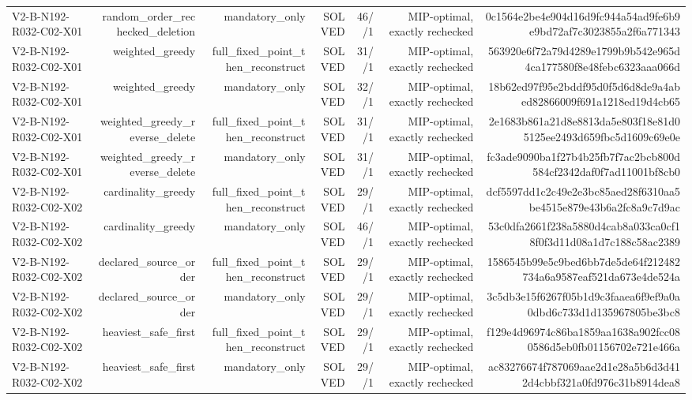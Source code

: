 {\begin{longtable}{lrrrrrr}
V2-B-N192-R032-C02-X01 & random\_order\_rechecked\_deletion & mandatory\_only & SOLVED & 46//1 & MIP-optimal, exactly rechecked & 0c1564e2be4e904d16d9fc944a54ad9fe6b9e9bd72af7c3023855a2f6a771343 \\
V2-B-N192-R032-C02-X01 & weighted\_greedy & full\_fixed\_point\_then\_reconstruct & SOLVED & 31//1 & MIP-optimal, exactly rechecked & 563920e6f72a79d4289e1799b9b542e965d4ca177580f8e48febc6323aaa066d \\
V2-B-N192-R032-C02-X01 & weighted\_greedy & mandatory\_only & SOLVED & 32//1 & MIP-optimal, exactly rechecked & 18b62ed97f95e2bddf95d0f5d6d8de9a4abed82866009f691a1218ed19d4cb65 \\
V2-B-N192-R032-C02-X01 & weighted\_greedy\_reverse\_delete & full\_fixed\_point\_then\_reconstruct & SOLVED & 31//1 & MIP-optimal, exactly rechecked & 2e1683b861a21d8e8813da5e803f18e81d05125ee2493d659fbc5d1609c69e0e \\
V2-B-N192-R032-C02-X01 & weighted\_greedy\_reverse\_delete & mandatory\_only & SOLVED & 31//1 & MIP-optimal, exactly rechecked & fc3ade9090ba1f27b4b25fb7f7ac2bcb800d584cf2342daf0f7ad11001bf8cb0 \\
V2-B-N192-R032-C02-X02 & cardinality\_greedy & full\_fixed\_point\_then\_reconstruct & SOLVED & 29//1 & MIP-optimal, exactly rechecked & dcf5597dd1c2c49e2e3bc85aed28f6310aa5be4515e879e43b6a2fc8a9c7d9ac \\
V2-B-N192-R032-C02-X02 & cardinality\_greedy & mandatory\_only & SOLVED & 46//1 & MIP-optimal, exactly rechecked & 53c0dfa2661f238a5880d4cab8a033ca0cf18f0f3d11d08a1d7c188c58ac2389 \\
V2-B-N192-R032-C02-X02 & declared\_source\_order & full\_fixed\_point\_then\_reconstruct & SOLVED & 29//1 & MIP-optimal, exactly rechecked & 1586545b99e5c9bed6bb7de5de64f212482734a6a9587eaf521da673e4de524a \\
V2-B-N192-R032-C02-X02 & declared\_source\_order & mandatory\_only & SOLVED & 29//1 & MIP-optimal, exactly rechecked & 3c5db3e15f6267f05b1d9c3faaea6f9ef9a0a0dbd6c733d1d135967805be3bc8 \\
V2-B-N192-R032-C02-X02 & heaviest\_safe\_first & full\_fixed\_point\_then\_reconstruct & SOLVED & 29//1 & MIP-optimal, exactly rechecked & f129e4d96974c86ba1859aa1638a902fcc080586d5eb0fb01156702e721e466a \\
V2-B-N192-R032-C02-X02 & heaviest\_safe\_first & mandatory\_only & SOLVED & 29//1 & MIP-optimal, exactly rechecked & ac83276674f787069aae2d1e28a5b6d3d412d4cbbf321a0fd976c31b8914dea8 \\

\end{longtable}}
